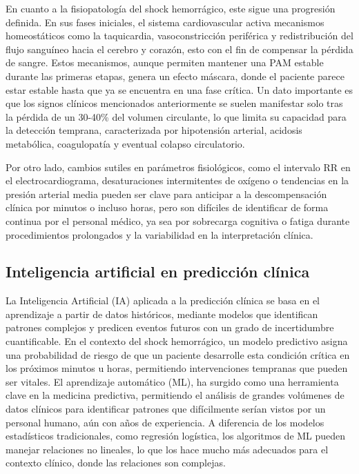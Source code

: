 En cuanto a la fisiopatología del shock hemorrágico, este sigue una progresión definida. En sus fases iniciales, el sistema cardiovascular activa mecanismos homeostáticos como la taquicardia, vasoconstricción periférica y redistribución del flujo sanguíneo hacia el cerebro y corazón, esto con el fin de compensar la pérdida de sangre. Estos mecanismos, aunque permiten mantener una PAM estable durante las primeras etapas, genera un efecto máscara, donde el paciente parece estar estable hasta que ya se encuentra en una fase crítica. Un dato importante es que los signos clínicos mencionados anteriormente se suelen manifestar solo tras la pérdida de un 30-40\% del volumen circulante, lo que limita su capacidad para la detección temprana, caracterizada por hipotensión arterial, acidosis metabólica, coagulopatía y eventual colapso circulatorio.

Por otro lado, cambios sutiles en parámetros fisiológicos, como el intervalo RR en el electrocardiograma, desaturaciones intermitentes de oxígeno o tendencias en la presión arterial media pueden ser clave para anticipar a la descompensación clínica por minutos o incluso horas, pero son difíciles de identificar de forma continua por el personal médico, ya sea por sobrecarga cognitiva o fatiga durante procedimientos prolongados y la variabilidad en la interpretación clínica.

\subsection{Inteligencia artificial en predicción clínica}

La Inteligencia Artificial (IA) aplicada a la predicción clínica se basa en el aprendizaje a partir de datos históricos, mediante modelos que identifican patrones complejos y predicen eventos futuros con un grado de incertidumbre cuantificable. En el contexto del shock hemorrágico, un modelo predictivo asigna una probabilidad de riesgo de que un paciente desarrolle esta condición crítica en los próximos minutos u horas, permitiendo intervenciones tempranas que pueden ser vitales. El aprendizaje automático (ML), ha surgido como una herramienta clave en la medicina predictiva, permitiendo el análisis de grandes volúmenes de datos clínicos para identificar patrones que difícilmente serían vistos por un personal humano, aún con años de experiencia. A diferencia de los modelos estadísticos tradicionales, como regresión logística, los algoritmos de ML pueden manejar relaciones no lineales, lo que los hace mucho más adecuados para el contexto clínico, donde las relaciones son complejas.

